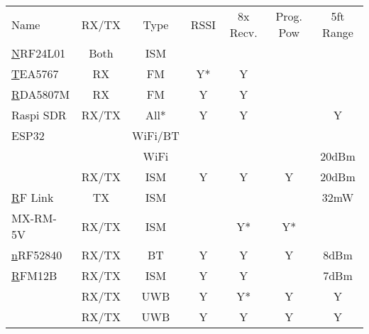 \documentclass{article}
\begin{document}
\begin{table}[]
\begin{tabular}{lcccccc}
\rowcolor[HTML]{E7E6E6} 
{\color[HTML]{44546A} Name} & {\color[HTML]{44546A} RX/TX} & {\color[HTML]{44546A} Type} & {\color[HTML]{44546A} RSSI} & {\color[HTML]{44546A} 8x Recv.} & {\color[HTML]{44546A} Prog. Pow} & {\color[HTML]{44546A} 5ft Range} \\
{\color[HTML]{0563C1} {\ul NRF24L01}} & Both & ISM &  &  &  &  \\
{\color[HTML]{0563C1} {\ul TEA5767}} & RX & FM & Y* & Y &  &  \\
{\color[HTML]{0563C1} {\ul RDA5807M}} & RX & FM & Y & Y &  &  \\
Raspi SDR & RX/TX & All* & Y & Y &  & Y \\
\cellcolor[HTML]{FFFF00}ESP32 &  & WiFi/BT &  &  &  &  \\
\cellcolor[HTML]{FFFF00}{\color[HTML]{0563C1} {\ul ESP8266}} &  & WiFi &  &  &  & 20dBm \\
\cellcolor[HTML]{FFFF00}{\color[HTML]{0563C1} {\ul RFM69HCW}} & RX/TX & ISM & Y & Y & Y & 20dBm \\
{\color[HTML]{0563C1} {\ul RF Link}} & TX & ISM &  &  &  & 32mW \\
MX-RM-5V & RX/TX & ISM &  & Y* & Y* &  \\
{\color[HTML]{0563C1} {\ul nRF52840}} & RX/TX & BT & Y & Y & Y & 8dBm \\
{\color[HTML]{0563C1} {\ul RFM12B}} & RX/TX & ISM & Y & Y &  & 7dBm \\
\cellcolor[HTML]{FFFF00}{\color[HTML]{0563C1} {\ul DWM1000}} & RX/TX & UWB & Y & Y* & Y & Y \\
\cellcolor[HTML]{E2EFDA}{\color[HTML]{0563C1} {\ul DWM3000}} & RX/TX & UWB & Y & Y & Y & Y
\end{tabular}
\end{table}
\end{document}
